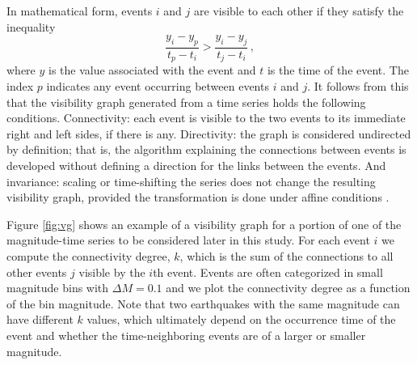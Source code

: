 In mathematical form, events $i$ and $j$ are visible to each other if they satisfy the inequality
%
\begin{equation}
	\frac{y_i - y_p }{t_p - t_i} > \frac{y_i - y_j}{ t_j - t_i} \, ,
	\label{eq:vg}
\end{equation}
%
\noindent
where $y$ is the value associated with the event and $t$ is the time of the event. The index $p$ indicates any event occurring between events $i$  and $j$. It follows from this that the visibility graph generated from a time series holds the following conditions. Connectivity: each event is visible to the two events to its immediate right and left sides, if there is any. Directivity: the graph is considered undirected by definition; that is, the algorithm explaining the connections between events is developed without defining a direction for the links between the events. And invariance: scaling or time-shifting the series does not change the resulting visibility graph, provided the transformation is done under affine conditions \citep{Lacasa2008}.

Figure \ref{fig:vg} shows an example of a visibility graph for a portion of one of the magnitude-time series to be considered later in this study. For each event $i$ we compute the connectivity degree, $k$, which is the sum of the connections to all other events $j$ visible by the $i$th event. Events are often categorized in small magnitude bins with $\Delta M = 0.1$ and we plot the connectivity degree as a function of the bin magnitude. Note that two earthquakes with the same magnitude can have different $k$ values, which ultimately depend on the occurrence time of the event and whether the time-neighboring events are of a larger or smaller magnitude.

